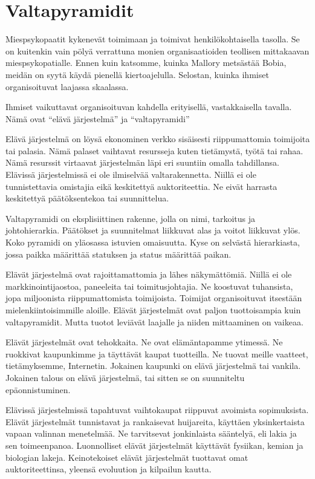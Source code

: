 \section{Valtapyramidit}

Miespsykopaatit kykenevät toimimaan ja toimivat henkilökohtaisella tasolla. Se on kuitenkin vain pölyä verrattuna monien organisaatioiden teollisen mittakaavan miespsykopatialle. Ennen kuin katsomme, kuinka Mallory metsästää Bobia, meidän on syytä käydä pienellä kiertoajelulla. Selostan, kuinka ihmiset organisoituvat laajassa skaalassa.

Ihmiset vaikuttavat organisoituvan kahdella erityisellä, vastakkaisella tavalla. Nämä ovat ``elävä järjestelmä'' ja ``valtapyramidi''

Elävä järjestelmä on löysä ekonominen verkko sisäisesti riippumattomia toimijoita tai palasia. Nämä palaset vaihtavat resursseja kuten tietämystä, työtä tai rahaa. Nämä resurssit virtaavat järjestelmän läpi eri suuntiin omalla tahdillansa. Elävissä järjestelmissä ei ole ilmiselvää valtarakennetta. Niillä ei ole tunnistettavia omistajia eikä keskitettyä auktoriteettia. Ne eivät harrasta keskitettyä päätöksentekoa tai suunnittelua.

Valtapyramidi on eksplisiittinen rakenne, jolla on nimi, tarkoitus ja johtohierarkia. Päätökset ja suunnitelmat liikkuvat alas ja voitot liikkuvat ylös. Koko pyramidi on yläosassa istuvien omaisuutta. Kyse on selvästä hierarkiasta, jossa paikka määrittää statuksen ja status määrittää paikan.

Elävät järjestelmä ovat rajoittamattomia ja lähes näkymättömiä. Niillä ei ole markkinointijaostoa, paneeleita tai toimitusjohtajia. Ne koostuvat tuhansista, jopa miljoonista riippumattomista toimijoista. Toimijat organisoituvat itsestään mielenkiintoisimmille aloille. Elävät järjestelmät ovat paljon tuottoisampia kuin valtapyramidit. Mutta tuotot leviävät laajalle ja niiden mittaaminen on vaikeaa.

Elävät järjestelmät ovat tehokkaita. Ne ovat elämäntapamme ytimessä. Ne ruokkivat kaupunkimme ja täyttävät kaupat tuotteilla. Ne tuovat meille vaatteet, tietämyksemme, Internetin. Jokainen kaupunki on elävä järjestelmä tai vankila. Jokainen talous on elävä järjestelmä, tai sitten se on suunniteltu epäonnistuminen.

Elävissä järjestelmissä tapahtuvat vaihtokaupat riippuvat avoimista sopimuksista. Elävät järjestelmät tunnistavat ja rankaisevat huijareita, käyttäen yksinkertaista vapaan valinnan menetelmää. Ne tarvitsevat jonkinlaista sääntelyä, eli lakia ja sen toimeenpanoa. Luonnolliset elävät järjestelmät käyttävät fysiikan, kemian ja biologian lakeja. Keinotekoiset elävät järjestelmät tuottavat omat auktoriteettinsa, yleensä evoluution ja kilpailun kautta.

